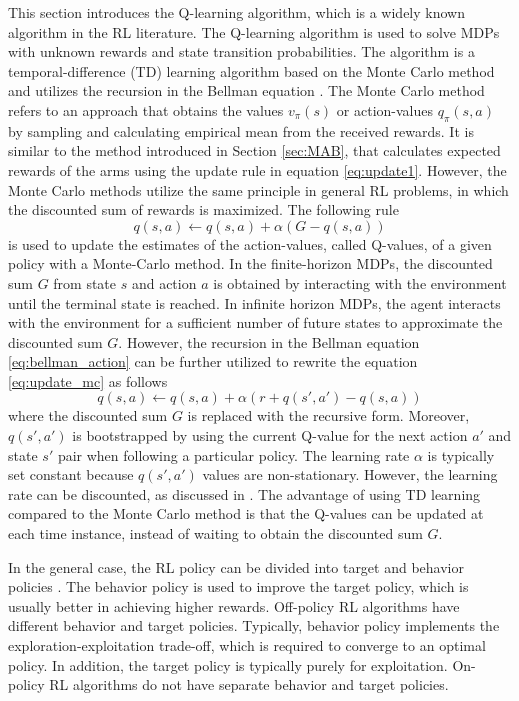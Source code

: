 \documentclass[english, 12pt, a4paper, elec, utf8, a-1b, online]{aaltothesis}
\begin{document}
This section introduces the Q-learning algorithm, which is a widely known algorithm in the RL literature.
The Q-learning algorithm is used to solve MDPs with unknown rewards and state transition probabilities.
The algorithm is a temporal-difference (TD) learning algorithm based on the Monte Carlo method and utilizes the recursion in the Bellman equation \cite{Sutton2018}.
The Monte Carlo method refers to an approach that obtains the values $v_\pi(s)$ or action-values $q_\pi(s, a)$ by sampling and calculating empirical mean from the received rewards. 
It is similar to the method introduced in Section \ref{sec:MAB}, that calculates expected rewards of the arms using the update rule in equation \eqref{eq:update1}. 
However, the Monte Carlo methods utilize the same principle in general RL problems, in which the discounted sum of rewards is maximized. 
The following rule \cite{Sutton2018}
\begin{equation}\label{eq:update_mc}
    q(s, a) \leftarrow q(s, a) + \alpha (G - q(s, a))
\end{equation}
is used to update the estimates of the action-values, called Q-values, of a given policy with a Monte-Carlo method. 
In the finite-horizon MDPs, the discounted sum $G$ from state $s$ and action $a$ is obtained by interacting with the environment until the terminal state is reached.   
In infinite horizon MDPs, the agent interacts with the environment for a sufficient number of future states to approximate the discounted sum $G$.
However, the recursion in the Bellman equation \eqref{eq:bellman_action} can be further utilized to rewrite the equation \eqref{eq:update_mc} as follows \cite{Sutton2018}
\begin{equation}\label{eq:update_td}
    q(s, a) \leftarrow q(s, a) + \alpha \left( r + q(s', a') - q(s, a) \right)
\end{equation}
where the discounted sum $G$ is replaced with the recursive form.
Moreover, $q(s', a')$ is bootstrapped by using the current Q-value for the next action $a'$ and state $s'$ pair when following a particular policy.
The learning rate $\alpha$ is typically set constant because $q(s', a')$ values are non-stationary.
However, the learning rate can be discounted, as discussed in \cite{Even-Dar2003}.
The advantage of using TD learning compared to the Monte Carlo method is that the Q-values can be updated at each time instance, instead of waiting to obtain the discounted sum $G$.

In the general case, the RL policy can be divided into target and behavior policies \cite{Sutton2018}.
The behavior policy is used to improve the target policy, which is usually better in achieving higher rewards.
Off-policy RL algorithms have different behavior and target policies.
Typically, behavior policy implements the exploration-exploitation trade-off, which is required to converge to an optimal policy. 
In addition, the target policy is typically purely for exploitation. 
On-policy RL algorithms do not have separate behavior and target policies. 
\end{document}
